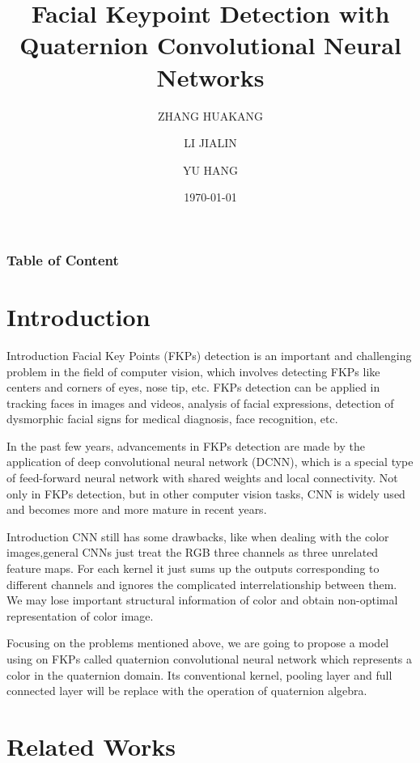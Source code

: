 \documentclass{beamer}
\title{Facial Keypoint Detection with Quaternion Convolutional Neural Networks}
\author{ZHANG HUAKANG\and LI JIALIN \and YU HANG}
\date{\today}
\begin{document}
\begin{frame}
    \titlepage
\end{frame}
\begin{frame}
    \frametitle{Table of Content}
    \tableofcontents
\end{frame}
\section{Introduction}
\begin{frame}{Introduction}
Facial Key Points (FKPs) detection is an important and challenging problem in the field of computer vision, which involves detecting FKPs like centers and corners of eyes, nose tip, etc.
FKPs detection can be applied in tracking faces in images and videos, analysis of facial expressions, detection of dysmorphic facial signs for medical diagnosis, face recognition, etc.

In the past few years, advancements in FKPs detection are made by the application of deep convolutional neural network (DCNN), which is a special type of feed-forward neural network with shared weights and local connectivity. Not only in FKPs detection, but in other computer vision tasks, CNN is widely used and becomes more and more mature in recent years.
\end{frame}

\begin{frame}{Introduction}
CNN still has some drawbacks, like when dealing with the color images,general CNNs just treat the RGB three channels as three unrelated feature maps. For each kernel it just sums up the outputs corresponding to different channels and ignores the complicated interrelationship between them.  We may lose important structural information of color and obtain non-optimal representation of color image.

Focusing on the problems mentioned above, we are going to propose a model using on FKPs called quaternion convolutional neural network which represents a color in  the quaternion domain. Its conventional kernel, pooling layer and full connected layer will be replace with the operation of quaternion algebra. 

\end{frame}


\section{Related Works}
\end{document}
